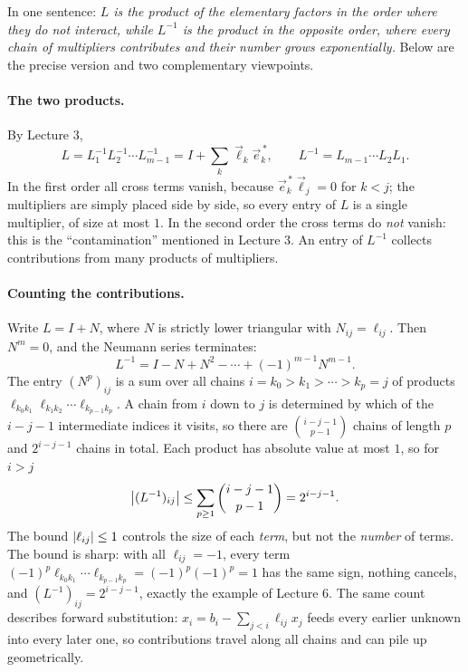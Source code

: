 \begin{answer}
  In one sentence: \emph{$L$ is the product of the elementary factors in the order where they do not interact, while $L^{-1}$ is the product in the opposite order, where every chain of multipliers contributes and their number grows exponentially.} Below are the precise version and two complementary viewpoints.

  \paragraph{The two products.} By Lecture 3,
  \begin{equation}
    L = L_1^{-1}L_2^{-1}\cdots L_{m-1}^{-1} = I + \sum_{k}\vec{\ell}_k\vec{e}_k^{\,\ast}, \qquad L^{-1} = L_{m-1}\cdots L_2L_1.
  \end{equation}
  In the first order all cross terms vanish, because $\vec{e}_k^{\,\ast}\vec{\ell}_j = 0$ for $k < j$; the multipliers are simply placed side by side, so every entry of $L$ is a single multiplier, of size at most $1$. In the second order the cross terms do \emph{not} vanish: this is the ``contamination'' mentioned in Lecture 3. An entry of $L^{-1}$ collects contributions from many products of multipliers.

  \paragraph{Counting the contributions.} Write $L = I + N$, where $N$ is strictly lower triangular with $N_{ij} = \ell_{ij}$. Then $N^m = 0$, and the Neumann series terminates:
  \begin{equation}
    L^{-1} = I - N + N^2 - \cdots + (-1)^{m-1}N^{m-1}.
  \end{equation}
  The entry $(N^p)_{ij}$ is a sum over all chains $i = k_0 > k_1 > \cdots > k_p = j$ of products $\ell_{k_0k_1}\ell_{k_1k_2}\cdots\ell_{k_{p-1}k_p}$. A chain from $i$ down to $j$ is determined by which of the $i - j - 1$ intermediate indices it visits, so there are $\binom{i-j-1}{p-1}$ chains of length $p$ and $2^{i-j-1}$ chains in total. Each product has absolute value at most $1$, so for $i > j$
  \begin{equation}
    \left\lvert (L^{-1})_{ij} \right\rvert \le \sum_{p \ge 1}\binom{i-j-1}{p-1} = 2^{i-j-1}.
  \end{equation}
  The bound $\left\lvert \ell_{ij} \right\rvert \le 1$ controls the size of each \emph{term}, but not the \emph{number} of terms. The bound is sharp: with all $\ell_{ij} = -1$, every term $(-1)^p\ell_{k_0k_1}\cdots\ell_{k_{p-1}k_p} = (-1)^p(-1)^p = 1$ has the same sign, nothing cancels, and $(L^{-1})_{ij} = 2^{i-j-1}$, exactly the example of Lecture 6. The same count describes forward substitution: $x_i = b_i - \sum_{j<i}\ell_{ij}x_j$ feeds every earlier unknown into every later one, so contributions travel along all chains and can pile up geometrically.


\end{answer}
